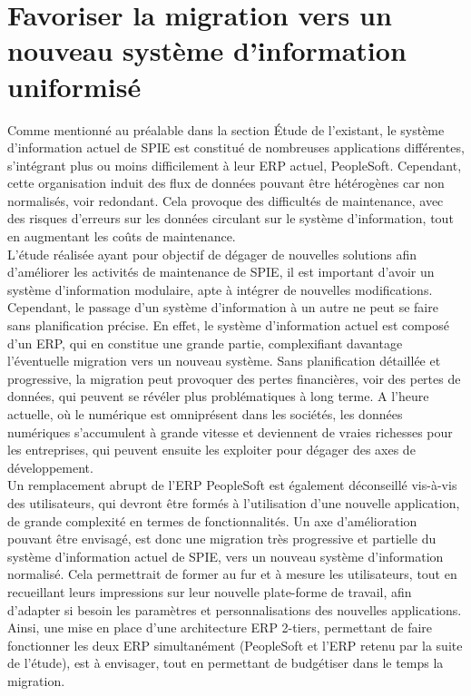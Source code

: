 
\section{Favoriser la migration vers un nouveau système d’information uniformisé}

Comme mentionné au préalable dans la section Étude de l’existant, le système d’information actuel de SPIE est constitué de nombreuses applications différentes, s’intégrant plus ou moins difficilement à leur ERP actuel, PeopleSoft. Cependant, cette organisation induit des flux de données pouvant être hétérogènes car non normalisés, voir redondant. Cela provoque des difficultés de maintenance, avec des risques d’erreurs sur les données circulant sur le système d’information, tout en augmentant les coûts de maintenance. \\

L’étude réalisée ayant pour objectif de dégager de nouvelles solutions afin d’améliorer les activités de maintenance de SPIE, il est important d’avoir un système d’information modulaire, apte à intégrer de nouvelles modifications. Cependant, le passage d’un système d’information à un autre ne peut se faire sans planification précise. En effet, le système d’information actuel est composé d’un ERP, qui en constitue une grande partie, complexifiant davantage l’éventuelle migration vers un nouveau système. Sans planification détaillée et progressive, la migration peut provoquer des pertes financières, voir des pertes de données, qui peuvent se révéler plus problématiques à long terme. A l’heure actuelle, où le numérique est omniprésent dans les sociétés, les données numériques s’accumulent à grande vitesse et deviennent de vraies richesses pour les entreprises, qui peuvent ensuite les exploiter pour dégager des axes de développement. \\

Un remplacement abrupt de l’ERP PeopleSoft est également déconseillé vis-à-vis des utilisateurs, qui devront être formés à l’utilisation d’une nouvelle application, de grande complexité en termes de fonctionnalités. Un axe d’amélioration pouvant être envisagé, est donc une migration très progressive et partielle du système d’information actuel de SPIE, vers un nouveau système d’information normalisé. Cela permettrait de former au fur et à mesure les utilisateurs, tout en recueillant leurs impressions sur leur nouvelle plate-forme de travail, afin d’adapter si besoin les paramètres et personnalisations des nouvelles applications. Ainsi, une mise en place d’une architecture ERP 2-tiers, permettant de faire fonctionner les deux ERP simultanément (PeopleSoft et l’ERP retenu par la suite de l’étude), est à envisager, tout en permettant de budgétiser dans le temps la migration.

